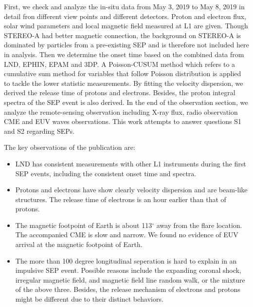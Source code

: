 First, we check and analyze the in-situ data from May 3, 2019 to May 8, 2019 in detail fron different view points and different detectors. Proton and electron flux, solar wind parameters and local magnetic field measured at \ac{L1} are given.
Though \ac{STEREO}-A had better magnetic connection, the background on \ac{STEREO}-A is dominated by particles from a pre-existing \ac{SEP} and is therefore not included here in analysis.
Then we determine the onset time based on the combined data from \ac{LND}, \ac{EPHIN}, \ac{EPAM} and \acs{3DP}. A Poisson-CUSUM method \citep{Huttunen2005AA, Palmroos2022FrASS} which refers to a cumulative sum method for variables that follow Poisson distribution is applied to tackle the lower statistic measurements. By fitting the velocity dispersion, we derived the release time of protons and electrons. Besides, the proton integral spectra of the \ac{SEP} event is also derived. In the end of the observation section, we analyze the remote-sensing observation including X-ray flux, radio observation \ac{CME} and EUV waves observations. This work attempts to answer questions S1 and S2 regarding \acp{SEP}.


The key observations of the publication are:
\begin{itemize}
    \item \ac{LND} has consistent measurements with other \ac{L1} instruments during the first \ac{SEP} events, including the consistent onset time and spectra.
    \item Protons and electrons have show clearly velocity dispersion and are beam-like structures. The release time of electrons is an hour earlier than that of protons.
    \item The magnetic footpoint of Earth is about 113$^\circ$ away from the flare location. The accompanied \ac{CME} is slow and narrow. We found no evidence of EUV arrival at the magnetic footpoint of Earth. 
    \item The more than 100 degree longitudinal seperation is hard to explain in an impulsive \ac{SEP} event. Possible reasons include the expanding coronal shock, irregular magnetic field, and magnetic field line random walk, or the mixture of the above three. Besides, the release mechanism of electrons and protons might be different due to their distinct behaviors.
\end{itemize}


